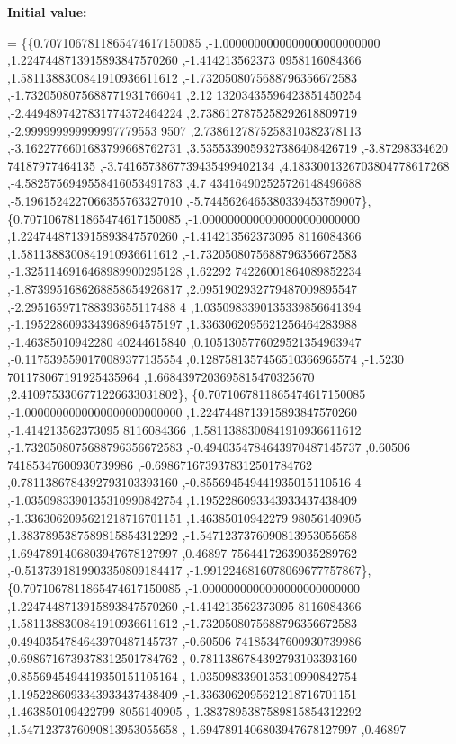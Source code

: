 {\bfseries Initial value\+:}
\begin{DoxyCode}
= \{\{0.7071067811865474617150085 ,-1.0000000000000000000000000 ,1.2247448713915893847570260 ,-1.414213562373
      0958116084366 ,1.5811388300841910936611612 ,-1.7320508075688796356672583 ,-1.7320508075688771931766041 ,2.12
      13203435596423851450254 ,-2.4494897427831774372464224 ,2.7386127875258292618809719 ,-2.999999999999997779553
      9507 ,2.7386127875258310382378113 ,-3.1622776601683799668762731 ,3.5355339059327386408426719 ,-3.87298334620
      74187977464135 ,-3.7416573867739435499402134 ,4.1833001326703804778617268 ,-4.5825756949558416053491783 ,4.7
      434164902525726148496688 ,-5.1961524227066355763327010 ,-5.7445626465380339453759007\},
\{0.7071067811865474617150085 ,-1.0000000000000000000000000 ,1.2247448713915893847570260 ,-1.414213562373095
      8116084366 ,1.5811388300841910936611612 ,-1.7320508075688796356672583 ,-1.3251146916468989900295128 ,1.62292
      74226001864089852234 ,-1.8739951686268858654926817 ,2.0951902932779487009895547 ,-2.295165971788393655117488
      4 ,1.0350983390135339856641394 ,-1.1952286093343968964575197 ,1.3363062095621256464283988 ,-1.46385010942280
      40244615840 ,0.1051305776029521354963947 ,-0.1175395590170089377135554 ,0.1287581357456510366965574 ,-1.5230
      701178067191925435964 ,1.6684397203695815470325670 ,2.4109753306771226633031802\},
\{0.7071067811865474617150085 ,-1.0000000000000000000000000 ,1.2247448713915893847570260 ,-1.414213562373095
      8116084366 ,1.5811388300841910936611612 ,-1.7320508075688796356672583 ,-0.4940354784643970487145737 ,0.60506
      74185347600930739986 ,-0.6986716739378312501784762 ,0.7811386784392793103393160 ,-0.855694549441935015110516
      4 ,-1.0350983390135310990842754 ,1.1952286093343933437438409 ,-1.3363062095621218716701151 ,1.46385010942279
      98056140905 ,1.3837895387589815854312292 ,-1.5471237376090813953055658 ,1.6947891406803947678127997 ,0.46897
      75644172639035289762 ,-0.5137391819903350809184417 ,-1.9912246816078069677757867\},
\{0.7071067811865474617150085 ,-1.0000000000000000000000000 ,1.2247448713915893847570260 ,-1.414213562373095
      8116084366 ,1.5811388300841910936611612 ,-1.7320508075688796356672583 ,0.4940354784643970487145737 ,-0.60506
      74185347600930739986 ,0.6986716739378312501784762 ,-0.7811386784392793103393160 ,0.8556945494419350151105164
       ,-1.0350983390135310990842754 ,1.1952286093343933437438409 ,-1.3363062095621218716701151 ,1.463850109422799
      8056140905 ,-1.3837895387589815854312292 ,1.5471237376090813953055658 ,-1.6947891406803947678127997 ,0.46897

\end{DoxyCode}
